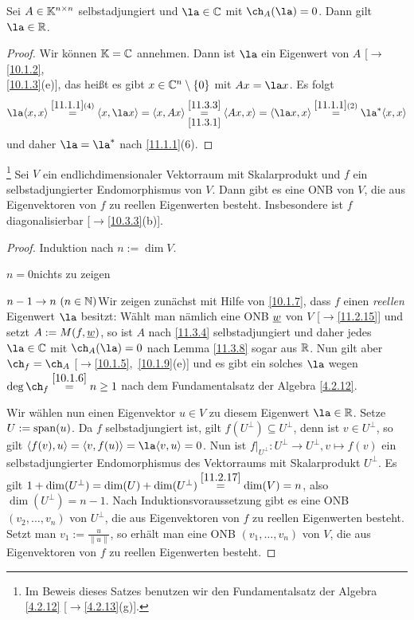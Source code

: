 \documentclass[../../main.tex]{subfiles}
\begin{document}
\begin{lem}\label{11.3.8}
Sei $A\in\mathbb K^{n\times n}$ selbstadjungiert und $\la\in\C$ mit $\ch_A(\la)=0$. Dann gilt
$\la\in\R$.
\end{lem}

\begin{proof} Wir können $\mathbb K=\mathbb C$ annehmen. Dann ist $\la$ ein Eigenwert von $A$ [$\to$\ref{10.1.2},\\
\ref{10.1.3}(e)], das heißt es gibt
$x\in\mathbb C^n\setminus\{0\}$ mit $Ax=\la x$. Es folgt
$$\la\langle x,x\rangle\overset{\ref{11.1.1}(4)}=\langle x,\la x\rangle=\langle x,Ax\rangle\underset{\ref{11.3.1}}{\overset{\ref{11.3.3}}=}\langle Ax,x\rangle=\langle\la x,x\rangle
\overset{\ref{11.1.1}(2)}=\la^*\langle x,x\rangle$$
und daher $\la=\la^*$ nach \ref{11.1.1}(6).
\end{proof}

\begin{sat}\footnote{Im Beweis dieses Satzes benutzen wir den Fundamentalsatz der Algebra \ref{4.2.12} [$\to$\ref{4.2.13}(g)].} \label{11.3.9} Sei $V$ ein endlichdimensionaler
Vektorraum mit Skalarprodukt und $f$ ein selbstadjungierter Endomorphismus von $V$. Dann gibt es eine ONB von $V$, die aus Eigenvektoren von $f$ zu reellen Eigenwerten besteht.
Insbesondere ist $f$ diagonalisierbar {\rm[$\to$\ref{10.3.3}(b)]}.
\end{sat}

\begin{proof} Induktion nach $n:=\dim V$.

\noindent
\underline{$n=0$}\quad nichts zu zeigen

\noindent
\underline{$n-1\to n\ (n\in \mathbb N)$}\quad Wir zeigen zunächst mit Hilfe von \ref{10.1.7}, dass $f$ einen \emph{reellen} Eigenwert $\la$
besitzt: Wählt man nämlich eine ONB ${\underline w}$ von $V$ [$\to$\ref{11.2.15}] und setzt $A:=M(f,{\underline w})$, so ist $A$
nach \ref{11.3.4} selbstadjungiert und daher jedes $\la\in\C$ mit $\ch_A(\la)=0$ nach Lemma \ref{11.3.8} sogar aus $\mathbb R$. Nun gilt aber $\ch_f=\ch_A$ [$\to$\ref{10.1.5},~\ref{10.1.9}(e)]
und es gibt ein solches $\la$ wegen $\deg\ch_f\overset{\ref{10.1.6}}=n\ge 1$ nach dem Fundamentalsatz der Algebra \ref{4.2.12}.

Wir wählen nun einen Eigenvektor $u\in V$ zu diesem Eigenwert $\la\in\R$. Setze $U:=\operatorname{span}(u)$. Da
$f$ selbstadjungiert ist, gilt $f(U^\perp)\subseteq U^\perp$, denn ist $v\in U^\perp$, so gilt
$\langle f(v),u\rangle=\langle v,f(u)\rangle=\la\langle v,u\rangle=0$. Nun ist $f|_{U^\perp}\colon U^\perp\to U^\perp,
v\mapsto f(v)$ ein selbstadjungierter Endomorphismus des Vektorraums mit Skalarprodukt $U^\perp$.
Es gilt $1+\dim(U^\perp)=\dim(U)+\dim(U^\perp)\overset{\ref{11.2.17}}=\dim(V)=n$,
also $\dim(U^\perp)=n-1$. Nach Induktionsvoraussetzung gibt es eine ONB
$(v_2,\dots,v_n)$ von $U^\perp$, die aus Eigenvektoren von $f$ zu reellen Eigenwerten besteht.
Setzt man $v_1:=\frac u{\|u\|}$, so erhält man eine ONB $(v_1,\dots,v_n)$ von
$V$, die aus Eigenvektoren von $f$ zu reellen Eigenwerten besteht.
\end{proof}
\end{document}
